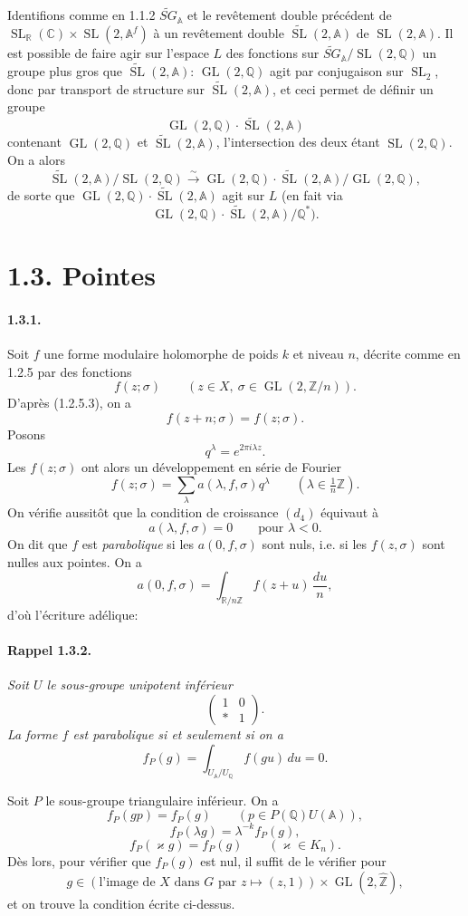 \documentclass[10pt,a4paper]{article}
\providecommand{\GL}{\operatorname{GL}}
\providecommand{\SL}{\operatorname{SL}}
\providecommand{\R}{\mathbb R}
\providecommand{\Q}{\mathbb Q}
\providecommand{\Z}{\mathbb Z}
\providecommand{\C}{\mathbb C}
\providecommand{\A}{\mathbb A}
\providecommand{\Af}{\mathbb A^f}
\providecommand{\SG}{SG}
\providecommand{\iso}{\xrightarrow{\sim}}
\begin{document}
Identifions comme en 1.1.2 $\widetilde{\SG}_{\A}$ et le revêtement double précédent de $\SL_{\R}(\C)\times\SL(2,\Af)$ à un revêtement double $\widetilde{\SL}(2,\A)$ de $\SL(2,\A)$. Il est possible de faire agir sur l'espace $L$ des fonctions sur $\widetilde{\SG}_{\A}/\SL(2,\Q)$ un groupe plus gros que $\widetilde{\SL}(2,\A)$: $\GL(2,\Q)$ agit par conjugaison sur $\SL_2$, donc par transport de structure sur $\widetilde{\SL}(2,\A)$, et ceci permet de définir un groupe
\[
\GL(2,\Q)\cdot\widetilde{\SL}(2,\A)
\]
contenant $\GL(2,\Q)$ et $\widetilde{\SL}(2,\A)$, l'intersection des deux étant $\SL(2,\Q)$. On a alors
\[
\widetilde{\SL}(2,\A)/\SL(2,\Q)
\iso
\GL(2,\Q)\cdot\widetilde{\SL}(2,\A)/\GL(2,\Q),
\]
de sorte que $\GL(2,\Q)\cdot\widetilde{\SL}(2,\A)$ agit sur $L$ (en fait via
\[
\GL(2,\Q)\cdot\widetilde{\SL}(2,\A)/\Q^*).
\]

\clearpage
{}
\hypertarget{authority-20}{}
\section*{1.3. Pointes}

\paragraph{1.3.1.} Soit $f$ une forme modulaire holomorphe de poids $k$ et niveau $n$, décrite comme en 1.2.5 par des fonctions
\[
f(z;\sigma)\qquad(z\in X,\ \sigma\in\GL(2,\Z/n)).
\]
D'après (1.2.5.3), on a
\[
f(z+n;\sigma)=f(z;\sigma).
\]
Posons
\[
q^\lambda=e^{2\pi i\lambda z}.
\]
Les $f(z;\sigma)$ ont alors un développement en série de Fourier
\[
\tag{1.3.1.1}
f(z;\sigma)=\sum_{\lambda}a(\lambda,f,\sigma)q^\lambda\qquad(\lambda\in\tfrac1n\Z).
\]
On vérifie aussitôt que la condition de croissance $(d_4)$ équivaut à
\[
\tag{1.3.1.2}
a(\lambda,f,\sigma)=0\qquad\text{pour }\lambda<0.
\]
On dit que $f$ est \emph{parabolique} si les $a(0,f,\sigma)$ sont nuls, i.e. si les $f(z,\sigma)$ sont \textquotedbl nulles aux pointes\textquotedbl. On a
\[
a(0,f,\sigma)=\int_{\R/n\Z}f(z+u)\,\frac{du}{n},
\]
d'où l'écriture adélique:

\paragraph{Rappel 1.3.2.}{\itshape  Soit $U$ le sous-groupe unipotent inférieur
\[
\begin{pmatrix}1&0\\ *&1\end{pmatrix}.
\]
La forme $f$ est \emph{parabolique} si et seulement si on a
\[
\tag{1.3.2.1}
f_P(g)=\int_{U_\A/U_\Q}f(gu)\,du=0.
\]
\par}
Soit $P$ le sous-groupe triangulaire inférieur. On a
\[
f_P(gp)=f_P(g)\qquad(p\in P(\Q)U(\A)),
\]
\[
f_P(\lambda g)=\lambda^{-k}f_P(g),
\]
\[
f_P(\varkappa g)=f_P(g)\qquad(\varkappa\in K_n).
\]
Dès lors, pour vérifier que $f_P(g)$ est nul, il suffit de le vérifier pour
\[
g\in(\text{l'image de }X\text{ dans }G\text{ par }z\mapsto(z,1))\times\GL(2,\widehat{\Z}),
\]
et on trouve la condition écrite ci-dessus.
\end{document}
